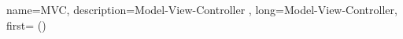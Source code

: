 



{
    name=MVC,
    description={Model-View-Controller%
    },
    long={Model-View-Controller},
    first={} ()
}